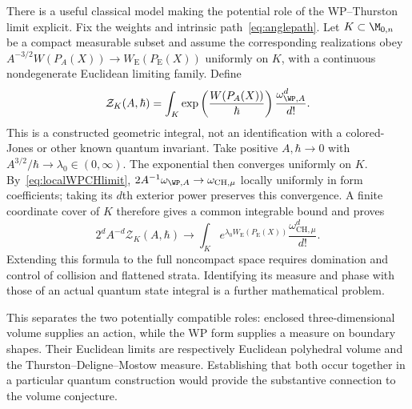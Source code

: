 There is a useful classical model making the potential role of
the WP--Thurston limit explicit. Fix the weights and intrinsic
path~\eqref{eq:anglepath}. Let $K\subset\M_{0,n}$ be a compact
measurable subset and assume the corresponding realizations obey
$A^{-3/2}W(P_A(X))\to W_{\mathrm E}(P_{\mathrm E}(X))$ uniformly
on $K$, with a continuous nondegenerate Euclidean limiting family.
Define
\begin{equation}
 \mathcal Z_K(A,\hbar)=\int_K
       \exp\left(\frac{W(P_A(X))}{\hbar}\right)
       \frac{\omega_{\WP,A}^d}{d!}.
 \label{eq:modelpartition}
\end{equation}
This is a constructed geometric integral, not an identification
with a colored-Jones or other known quantum invariant. Take positive $A,\hbar\to0$ with
$A^{3/2}/\hbar\to\lambda_0\in(0,\infty)$. The exponential
then converges uniformly on $K$. By~\eqref{eq:localWPCHlimit},
$2A^{-1}\omega_{\WP,A}\to\omega_{\mathrm{CH},\mu}$ locally
uniformly in form coefficients; taking its $d$th exterior power
preserves this convergence. A finite coordinate cover of $K$
therefore gives a common integrable bound and proves
\begin{equation}
 2^d A^{-d}\mathcal Z_K(A,\hbar)\longrightarrow
 \int_K e^{\lambda_0 W_{\mathrm E}(P_{\mathrm E}(X))}
                 \frac{\omega_{\mathrm{CH},\mu}^d}{d!}.
 \label{eq:modelpartitionlimit}
\end{equation}
Extending this formula to the full noncompact space requires
 domination and control of collision and flattened strata.
 Identifying its measure and phase with those of an actual quantum
 state integral is a further mathematical problem.

This separates the two potentially compatible roles: enclosed
three-dimensional volume supplies an action, while the WP form
supplies a measure on boundary shapes. Their Euclidean limits
are respectively Euclidean polyhedral volume and the
Thurston--Deligne--Mostow measure. Establishing that both occur
together in a particular quantum construction would provide the
substantive connection to the volume conjecture.
